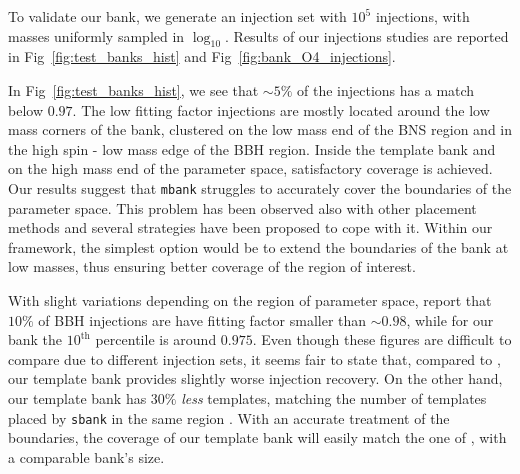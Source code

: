 \documentclass[twocolumn,showpacs,preprintnumbers,nofootinbib,prd,
superscriptaddress,10pt]{revtex4-2}
\newcommand{\stefano}[1]{{\textcolor{blue}{\texttt{SS: #1}} }}
\begin{document}
To validate our bank, we generate an injection set with $10^5$ injections, with masses uniformly sampled in $\log_{10}$.
Results of our injections studies are reported in Fig~\ref{fig:test_banks_hist} and Fig~\ref{fig:bank_O4_injections}.

In Fig~\ref{fig:test_banks_hist}, we see that $\sim 5\%$ of the injections has a match below $0.97$. The low fitting factor injections are mostly located around the low mass corners of the bank, clustered on the low mass end of the BNS region and in the high spin - low mass edge of the BBH region.
Inside the template bank and on the high mass end of the parameter space, satisfactory coverage is achieved.
Our results suggest that \texttt{mbank} struggles to accurately cover the boundaries of the parameter space. This problem has been observed also with other placement methods \cite{} and several strategies have been proposed \cite{} to cope with it. Within our framework, the simplest option would be to extend the boundaries of the bank at low masses, thus ensuring better coverage of the region of interest.

With slight variations depending on the region of parameter space, \cite{Sakon:2022ibh} report that $10\%$ of BBH injections are have fitting factor smaller than $\sim 0.98$, while for our bank the $10^\text{th}$ percentile is around $0.975$.
Even though these figures are difficult to compare due to different injection sets, it seems fair to state that, compared to \cite{Sakon:2022ibh}, our template bank provides slightly worse injection recovery.
On the other hand, our template bank has $30\%$ {\it less} templates, matching the number of templates placed by \texttt{sbank} in the same region \cite{Sakon:2022ibh}. With an accurate treatment of the boundaries, the coverage of our template bank will easily match the one of \cite{Sakon:2022ibh}, with a comparable bank's size.


\end{document}
